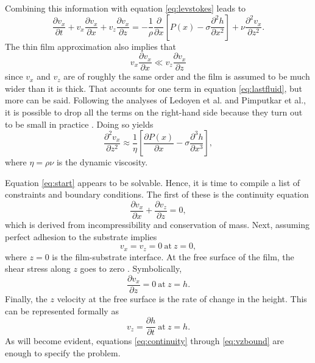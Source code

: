 \documentclass[twocolumn,showpacs,preprintnumbers,amsmath,amssymb]{revtex4}
\begin{document}
Combining this information with equation \ref{eq:levstokes} leads to
\begin{equation}
  \frac{\partial v_x}{\partial t}+v_x\frac{\partial v_x}{\partial x} +v_z\frac{\partial
                                v_x}{\partial z} = - \frac{1}{\rho}\frac{\partial}{\partial
                                x}\left[P(x)-\sigma\frac{\partial^2 h}{\partial x^2}\right]+\nu\frac{\partial^2
                                v_x}{\partial z^2} \mathrm{.} \label{eq:lastfluid}
\end{equation}
The thin film approximation also implies that
\begin{equation}
v_x\frac{\partial v_x}{\partial x} \ll v_z\frac{\partial v_x}{\partial z}
\end{equation}
since $v_x$ and $v_z$ are of roughly the same order and the film is
assumed to be much wider than it is thick. That accounts for one term
in equation \ref{eq:lastfluid}, but more can be said. Following the
analyses of Ledoyen et al. and Pimputkar et al., it is possible to
drop all the terms on the right-hand side because they turn out to be
small in practice \cite{ledoyen, pimputkar, barrett}. Doing so yields
\begin{equation}
\frac{\partial^2 v_x}{\partial z^2} \approx \frac{1}{\eta}\left[\frac{\partial
P(x)}{\partial x}-\sigma\frac{\partial^3 h}{\partial x^3}\right] \mathrm{,}
\label{eq:start}
\end{equation}
where $\eta= \rho\nu$ is the dynamic viscosity.

Equation \ref{eq:start} appears to be solvable. Hence, it is time to
compile a list of constraints and boundary conditions. The first of
these is the continuity equation
\begin{equation}
\frac{\partial v_x}{\partial x}+\frac{\partial v_z}{\partial z} =0 \mathrm{,}
\label{eq:continuity}
\end{equation}
which is derived from incompressibility and conservation of
mass. Next, assuming perfect adhesion to the substrate implies
\begin{equation}
v_x=v_z=0 \mathrm{\ at\ } z=0 \mathrm{,} \label{eq:substrate}
\end{equation}
where $z=0$ is the film-substrate interface. At the free surface of
the film, the shear stress along $z$ goes to zero \cite{levich,
barrett}. Symbolically,
\begin{equation}
\frac{\partial v_x}{\partial z}=0 \mathrm{\ at\ } z=h \mathrm{.} \label{eq:shear}
\end{equation}
Finally, the $z$ velocity at the free surface is the rate of change in
the height. This can be represented formally as
\begin{equation}
v_z=\frac{\partial h}{\partial t} \mathrm{\ at\ } z=h \mathrm{.} \label{eq:vzbound}
\end{equation}
As will become evident, equations \ref{eq:continuity} through
\ref{eq:vzbound} are enough to specify the problem.
\end{document}
